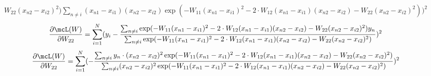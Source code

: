 \documentclass[submit]{harvardml}
\begin{document}
\begin{enumerate}
\begin{equation*}
\begin{split}
{    W_{22}(x_{n2} - x_{i2})^2)}{ \sum_{n\neq i}
    (x_{n1} - x_{i1})(x_{n2} - x_{i2}) \exp(-W_{11}(x_{n1} - x_{i1})^2 - 2 \cdot
    W_{12}(x_{n1} - x_{i1})(x_{n2} - x_{i2}) -
    W_{22}(x_{n2} - x_{i2})^2) })^2 
    \end{split}
    \end{equation*}
\newline
    \begin{equation*}
    \frac{\partial \mcL(W)}{\partial W_{22}} =  \sum_{i = 1}^{N} (y_i - \frac{ \sum_{n\neq
    i} \exp(-W_{11}(x_{n1} - x_{i1})^2 - 2 \cdot
    W_{12}(x_{n1} - x_{i1})(x_{n2} - x_{i2}) -
    W_{22}(x_{n2} - x_{i2})^2) y_n  }{ \sum_{n\neq i}
    \exp(-W_{11}(x_{n1} - x_{i1})^2 - 2 \cdot
    W_{12}(x_{n1} - x_{i1})(x_{n2} - x_{i2}) -
    W_{22}(x_{n2} - x_{i2})^2) })^2 
    \end{equation*}
    \begin{equation*}
    \frac{\partial \mcL(W)}{\partial W_{22}} = \sum_{i = 1}^{N} (-\frac{ \sum_{n\neq
    i} y_n \cdot (x_{n2} - x_{i2})^2 \exp(-W_{11}(x_{n1} - x_{i1})^2 - 2 \cdot
    W_{12}(x_{n1} - x_{i1})(x_{n2} - x_{i2}) -
    W_{22}(x_{n2} - x_{i2})^2)}{ \sum_{n\neq i}
   (x_{n2} - x_{i2})^2 \exp(-W_{11}(x_{n1} - x_{i1})^2 - 2 \cdot
    W_{12}(x_{n1} - x_{i1})(x_{n2} - x_{i2}) -
    W_{22}(x_{n2} - x_{i2})^2) })^2 
    \end{equation*}
\end{enumerate}
\newpage

\end{document}
